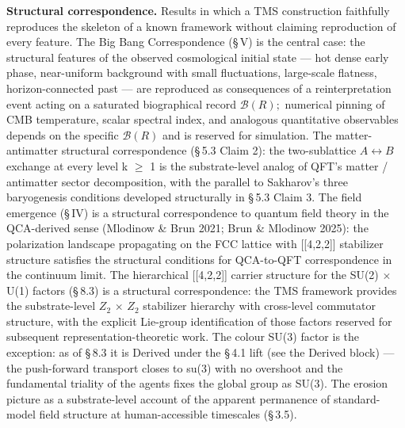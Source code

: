 \documentclass[11pt,oneside]{report}
\theoremstyle{definition}
\theoremstyle{remark}
\begin{document}
\textbf{Structural correspondence.} Results in which a TMS construction
faithfully reproduces the skeleton of a known framework without claiming
reproduction of every feature. The Big Bang Correspondence (\S\,V) is the
central case: the structural features of the observed cosmological
initial state --- hot dense early phase, near-uniform background with
small fluctuations, large-scale flatness, horizon-connected past --- are
reproduced as consequences of a reinterpretation event acting on a
saturated biographical record \ensuremath{\mathcal{B}(R);} numerical pinning of CMB
temperature, scalar spectral index, and analogous quantitative
observables depends on the specific \ensuremath{\mathcal{B}(R)} and is reserved for simulation.
The matter-antimatter structural correspondence (\S\,5.3 Claim 2): the
two-sublattice \ensuremath{A\leftrightarrow B} exchange at every level k \ensuremath{\geq} 1 is the substrate-level
analog of QFT's matter / antimatter sector decomposition, with the
parallel to Sakharov's three baryogenesis conditions developed
structurally in \S\,5.3 Claim 3. The field emergence (\S\,IV) is a structural
correspondence to quantum field theory in the QCA-derived sense
(Mlodinow \& Brun 2021; Brun \& Mlodinow 2025): the polarization
landscape propagating on the FCC lattice with [[4,2,2]]
stabilizer structure satisfies the structural conditions for QCA-to-QFT
correspondence in the continuum limit. The hierarchical
[[4,2,2]] carrier structure for the SU(2) \ensuremath{\times} U(1) factors (\S\,8.3)
is a structural correspondence: the TMS framework provides the
substrate-level \ensuremath{Z_{2}} \ensuremath{\times} \ensuremath{Z_{2}} stabilizer hierarchy with cross-level commutator
structure, with the explicit Lie-group identification of those factors
reserved for subsequent representation-theoretic work. The colour SU(3)
factor is the exception: as of \S\,8.3 it is Derived under the \S\,4.1 lift
(see the Derived block) --- the push-forward transport closes to su(3)
with no overshoot and the fundamental triality of the agents fixes the
global group as SU(3). The erosion picture as a substrate-level account
of the apparent permanence of standard-model field structure at
human-accessible timescales (\S\,3.5).
\end{document}
